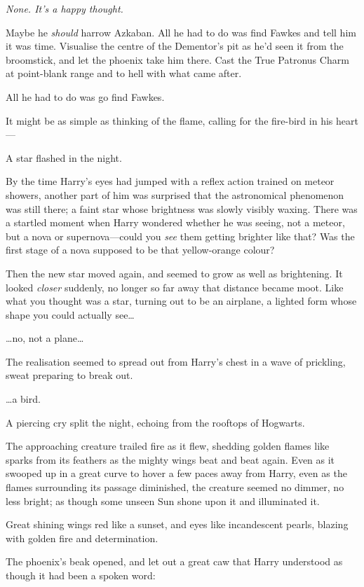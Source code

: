 \emph{None. It's a happy thought.}

Maybe he \emph{should} harrow Azkaban. All he had to do was find Fawkes
and tell him it was time. Visualise the centre of the Dementor's pit as
he'd seen it from the broomstick, and let the phoenix take him there.
Cast the True Patronus Charm at point-blank range and to hell with what
came after.

All he had to do was go find Fawkes.

It might be as simple as thinking of the flame, calling for the
fire-bird in his heart---

A star flashed in the night.

By the time Harry's eyes had jumped with a reflex action trained on
meteor showers, another part of him was surprised that the astronomical
phenomenon was still there; a faint star whose brightness was slowly
visibly waxing. There was a startled moment when Harry wondered whether
he was seeing, not a meteor, but a nova or supernova---could you
\emph{see} them getting brighter like that? Was the first stage of a
nova supposed to be that yellow-orange colour?

Then the new star moved again, and seemed to grow as well as
brightening. It looked \emph{closer} suddenly, no longer so far away
that distance became moot. Like what you thought was a star, turning out
to be an airplane, a lighted form whose shape you could actually
see\ldots{}

\ldots{}no, not a plane\ldots{}

The realisation seemed to spread out from Harry's chest in a wave of
prickling, sweat preparing to break out.

\ldots{}a bird.

A piercing cry split the night, echoing from the rooftops of Hogwarts.

The approaching creature trailed fire as it flew, shedding golden flames
like sparks from its feathers as the mighty wings beat and beat again.
Even as it swooped up in a great curve to hover a few paces away from
Harry, even as the flames surrounding its passage diminished, the
creature seemed no dimmer, no less bright; as though some unseen Sun
shone upon it and illuminated it.

Great shining wings red like a sunset, and eyes like incandescent
pearls, blazing with golden fire and determination.

The phoenix's beak opened, and let out a great caw that Harry understood
as though it had been a spoken word:

